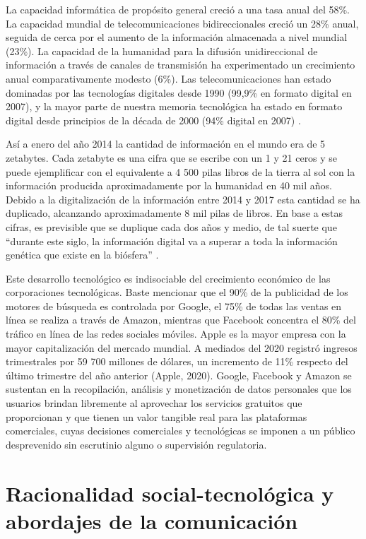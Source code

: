 \documentclass[
  spanish,
  11pt,
  a4paper,
]{scrbook}
\begin{document}
La capacidad informática de propósito general creció a una tasa anual
del 58\%. La capacidad mundial de telecomunicaciones bidireccionales
creció un 28\% anual, seguida de cerca por el aumento de la información
almacenada a nivel mundial (23\%). La capacidad de la humanidad para la
difusión unidireccional de información a través de canales de
transmisión ha experimentado un crecimiento anual comparativamente
modesto (6\%). Las telecomunicaciones han estado dominadas por las
tecnologías digitales desde 1990 (99,9\% en formato digital en 2007), y
la mayor parte de nuestra memoria tecnológica ha estado en formato
digital desde principios de la década de 2000 (94\% digital en 2007)
\autocite[60]{Hilbert2011}.

Así a enero del año 2014 la cantidad de información en el mundo era de 5
zetabytes. Cada zetabyte es una cifra que se escribe con un 1 y 21 ceros
y se puede ejemplificar con el equivalente a 4 500 pilas libros de la
tierra al sol con la información producida aproximadamente por la
humanidad en 40 mil años. Debido a la digitalización de la información
entre 2014 y 2017 esta cantidad se ha duplicado, alcanzando
aproximadamente 8 mil pilas de libros. En base a estas cifras, es
previsible que se duplique cada dos años y medio, de tal suerte que
``durante este siglo, la información digital va a superar a toda la
información genética que existe en la biósfera''
\autocite{Hopenhayn2017}.

Este desarrollo tecnológico es indisociable del crecimiento económico de
las corporaciones tecnológicas. Baste mencionar que el 90\% de la
publicidad de los motores de búsqueda es controlada por Google, el 75\%
de todas las ventas en línea se realiza a través de Amazon, mientras que
Facebook concentra el 80\% del tráfico en línea de las redes sociales
móviles. Apple es la mayor empresa con la mayor capitalización del
mercado mundial. A mediados del 2020 registró ingresos trimestrales por
59 700 millones de dólares, un incremento de 11\% respecto del último
trimestre del año anterior (Apple, 2020). Google, Facebook y Amazon se
sustentan en la recopilación, análisis y monetización de datos
personales que los usuarios brindan libremente al aprovechar los
servicios gratuitos que proporcionan y que tienen un valor tangible real
para las plataformas comerciales, cuyas decisiones comerciales y
tecnológicas se imponen a un público desprevenido sin escrutinio alguno
o supervisión regulatoria.

\section*{Racionalidad social-tecnológica y abordajes de la
comunicación}\label{racionalidad-social-tecnoluxf3gica-y-abordajes-de-la-comunicaciuxf3n}
\end{document}
